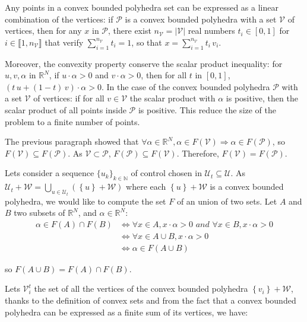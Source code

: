 \documentclass{article}
\theoremstyle{named}
\begin{document}
Any points in a convex bounded polyhedra set can be expressed as a linear combination of the vertices: if $\mathcal{P}$ is a convex bounded polyhedra with a set $\mathcal{V}$ of vertices, then for any $x$ in $\mathcal{P}$, there exist $n_{\mathcal{V}} = \left | \mathcal{V} \right |$ real numbers $t_i \in [0,1]$ for $i \in \llbracket 1,n_{\mathcal{V}} \rrbracket$ that verify $\sum_{i=1}^{n_{\mathcal{V}}} t_i = 1$, so that $x = \sum_{i=1}^{n_{\mathcal{V}}} t_i \, v_i$.

Moreover, the convexity property conserve the scalar product inequality: for $u,v,\alpha$ in $\mathbb{R}^N$, if  $u \cdot \alpha > 0$ and $v \cdot \alpha > 0$, then for all $t$ in $[0,1]$, $ (t \, u + (1-t) \, v ) \cdot \alpha> 0$.
In the case of the convex bounded polyhedra $\mathcal{P}$ with a set $\mathcal{V}$ of vertices: if for all $v \in \mathcal{V}$ the scalar product with $\alpha$ is positive, then the scalar product of all points inside $\mathcal{P}$ is positive. This reduce the size of the problem to a finite number of points.

The previous paragraph showed that $\forall \alpha \in \mathbb{R}^N, \alpha \in F(\mathcal{V}) \Rightarrow \alpha \in F(\mathcal{P})$, so $F(\mathcal{V}) \subseteq F(\mathcal{P})$. As $\mathcal{V} \subset \mathcal{P}$, $F(\mathcal{P}) \subseteq F(\mathcal{V})$. Therefore, $F(\mathcal{V}) = F(\mathcal{P})$.

Lets consider a sequence $\{u_k\}_{k \in \mathbb{N}}$ of control chosen in  $\mathcal{U}_t \subseteq \mathcal{U}$.
As $\mathcal{U}_t + \mathcal{W} = \bigcup_{ u \in \mathcal{U}_t}\left ( \left \{ u \right\} + \mathcal{W} \right )$ where each $\left \{ u \right\} + \mathcal{W}$ is a convex bounded polyhedra, we would like to compute the set $F$ of an union of two sets.
Let $A$ and $B$ two subsets of $\mathbb{R}^N$, and $\alpha \in\mathbb{R}^N$:
\begin{equation}\label{Funion}
\begin{aligned}
  \alpha \in F(A) \cap F(B) & \Leftrightarrow \forall x \in A,x \cdot \alpha > 0 \textit{ and } \forall x \in B,x \cdot \alpha > 0
  \\ & \Leftrightarrow \forall x \in A \cup B,x \cdot \alpha > 0
  \\ & \Leftrightarrow \alpha \in F(A \cup B)
\end{aligned}
\end{equation}

so $F(A \cup B) = F(A) \cap F(B)$.

Lets $\mathcal{V}^t_i$ the set of all the vertices of the convex bounded polyhedra $\left \{ v_i \right \} + \mathcal{W}$, thanks to the definition of convex sets and from the fact that a convex bounded polyhedra can be expressed as a finite sum of its vertices, we have:
\end{document}
